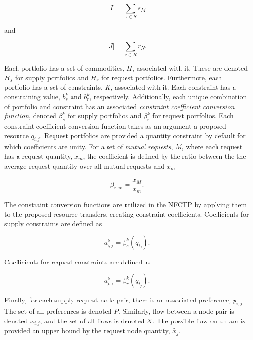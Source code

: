 \begin{equation}
  \left|{I}\right| = \sum_{s \in S} s_M
\end{equation}

and

\begin{equation}
  \left|{J}\right| = \sum_{r \in R} r_N.
\end{equation}

Each portfolio has a set of commodities, $H$, associated with it. These are
denoted $H_s$ for supply portfolios and $H_r$ for request
portfolios. Furthermore, each portfolio has a set of constraints, $K$,
associated with it. Each constraint has a constraining value, $b_s^k$ and
$b_r^k$, respectively. Additionally, each unique combination of portfolio and
constraint has an associated \textit{constraint coefficient conversion
  function}, denoted $\beta_s^k$ for supply portfolios and $\beta_r^k$ for
request portfolios. Each constraint coefficient conversion function takes as an
argument a proposed resource $q_{i,j}$. Request portfolios are provided a
quantity constraint by default for which coefficients are unity. For a set of
\textit{mutual requests}, $M$, where each request has a request quantity, $x_m$,
the coefficient is defined by the ratio between the the average request quantity
over all mutual requests and $x_m$

\begin{equation}
  \beta_{r, m} = \frac{\bar{x_M}}{x_m}.
\end{equation}

The constraint conversion functions are utilized in the NFCTP by applying them
to the proposed resource transfers, creating constraint
coefficients. Coefficients for supply constraints are defined as

\begin{equation}
  a^k_{i, j} = \beta_s^k(q_{i_j}).
\end{equation}

\noindent
Coefficients for request constraints are defined as

\begin{equation}
  a^k_{j, i} = \beta_r^k(q_{i_j}).
\end{equation}

Finally, for each supply-request node pair, there is an associated preference,
$p_{i, j}$. The set of all preferences is denoted $P$. Similarly, flow between a
node pair is denoted $x_{i, j}$, and the set of all flows is denoted $X$. The
possible flow on an arc is provided an upper bound by the request node quantity,
$\tilde{x_j}$.

